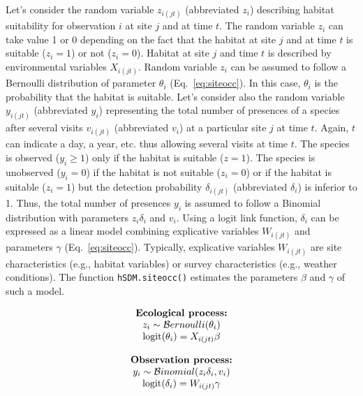 \documentclass[a4paper, 12pt, leqno]{article}\usepackage[]{graphicx}\usepackage[]{color}
\newcommand{\logit}{\text{logit}}
\begin{document}
Let's consider the random variable $z_{i(jt)}$ (abbreviated $z_i$) describing habitat
suitability for observation $i$ at site $j$ and at time $t$. The random variable $z_i$ can
take value 1 or 0 depending on the fact that the habitat at site $j$ and at time $t$ is
suitable ($z_i=1$) or not ($z_i=0$). Habitat at site $j$ and time $t$ is described by
environmental variables $X_{i(jt)}$. Random variable $z_i$ can be assumed to follow a
Bernoulli distribution of parameter $\theta_i$ (Eq.~\ref{eq:siteocc}). In this case,
$\theta_i$ is the probability that the habitat is suitable. Let's consider also the random
variable $y_{i(jt)}$ (abbreviated $y_i$) representing the total number of presences of a
species after several visits $v_{i(jt)}$ (abbreviated $v_i$) at a particular site $j$ at
time $t$. Again, $t$ can indicate a day, a year, etc. thus allowing several visits at time
$t$. The species is observed ($y_i \geq 1$) only if the habitat is suitable ($z=1$). The
species is unobserved ($y_i=0$) if the habitat is not suitable ($z_i=0$) or if the habitat
is suitable ($z_i=1$) but the detection probability $\delta_{i(jt)}$ (abbreviated
$\delta_i$) is inferior to 1. Thus, the total number of presences $y_i$ is assumed to
follow a Binomial distribution with parameters $z_i \delta_i$ and $v_i$. Using a logit
link function, $\delta_i$ can be expressed as a linear model combining explicative
variables $W_{i(jt)}$ and parameters $\gamma$ (Eq.~\ref{eq:siteocc}). Typically,
explicative variables $W_{i(jt)}$ are site characteristics (e.g., habitat variables) or
survey characteristics (e.g., weather conditions). The function \texttt{hSDM.siteocc()}
estimates the parameters $\beta$ and $\gamma$ of such a model.

\begin{equation}
  \begin{tabular}{c}
    \textbf{Ecological process:}\\
    $z_i \sim \mathcal{B}ernoulli(\theta_i)$ \\
    $\logit(\theta_i) = X_{i(jt)} \beta$\\
    ~ \\
    \textbf{Observation process:}\\
    $y_i \sim \mathcal{B}inomial(z_i \delta_i, v_i)$ \\
    $\logit(\delta_i) = W_{i(jt)} \gamma$ \\
  \end{tabular}
  \label{eq:siteocc}
\end{equation}
\end{document}
